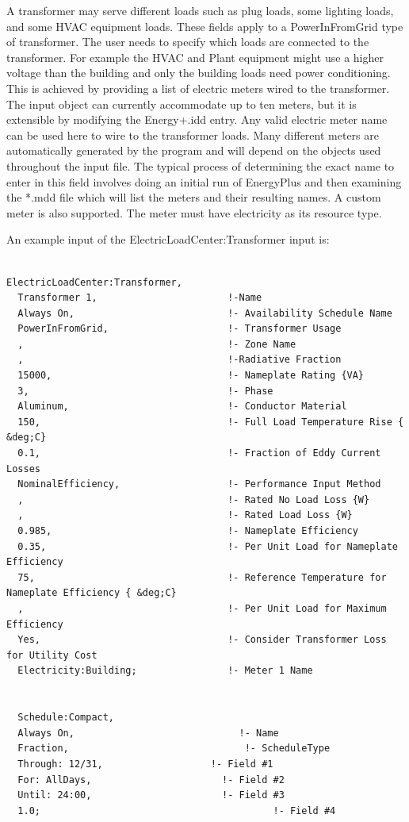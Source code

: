 A transformer may serve different loads such as plug loads, some lighting loads, and some HVAC equipment loads. These fields apply to a PowerInFromGrid type of transformer. The user needs to specify which loads are connected to the transformer. For example the HVAC and Plant equipment might use a higher voltage than the building and only the building loads need power conditioning. This is achieved by providing a list of electric meters wired to the transformer. The input object can currently accommodate up to ten meters, but it is extensible by modifying the Energy+.idd entry. Any valid electric meter name can be used here to wire to the transformer loads. Many different meters are automatically generated by the program and will depend on the objects used throughout the input file. The typical process of determining the exact name to enter in this field involves doing an initial run of EnergyPlus and then examining the *.mdd file which will list the meters and their resulting names. A custom meter is also supported. The meter must have electricity as its resource type.

An example input of the ElectricLoadCenter:Transformer input is:

\begin{lstlisting}

ElectricLoadCenter:Transformer,
  Transformer 1,                       !-Name
  Always On,                           !- Availability Schedule Name
  PowerInFromGrid,                     !- Transformer Usage
  ,                                    !- Zone Name
  ,                                    !-Radiative Fraction
  15000,                               !- Nameplate Rating {VA}
  3,                                   !- Phase
  Aluminum,                            !- Conductor Material
  150,                                 !- Full Load Temperature Rise { &deg;C}
  0.1,                                 !- Fraction of Eddy Current Losses
  NominalEfficiency,                   !- Performance Input Method
  ,                                    !- Rated No Load Loss {W}
  ,                                    !- Rated Load Loss {W}
  0.985,                               !- Nameplate Efficiency
  0.35,                                !- Per Unit Load for Nameplate Efficiency
  75,                                  !- Reference Temperature for Nameplate Efficiency { &deg;C}
  ,                                    !- Per Unit Load for Maximum Efficiency
  Yes,                                 !- Consider Transformer Loss for Utility Cost
  Electricity:Building;                !- Meter 1 Name


  Schedule:Compact,
  Always On,                             !- Name
  Fraction,                               !- ScheduleType
  Through: 12/31,                   !- Field #1
  For: AllDays,                       !- Field #2
  Until: 24:00,                       !- Field #3
  1.0;                                         !- Field #4
\end{lstlisting}

